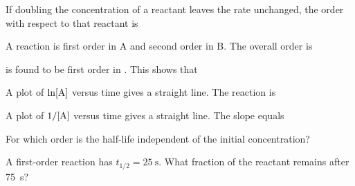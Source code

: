 \documentclass{apchem-exam}
\begin{document}
\begin{mcq}
  If doubling the concentration of a reactant leaves the rate unchanged, the
  order with respect to that reactant is
  \choices
\end{mcq}

\begin{mcq}
  A reaction is first order in A and second order in B. The overall order is
  \choices
\end{mcq}

\begin{mcq}
   is found to be first order in . This
  shows that
  \choices
\end{mcq}

\begin{mcq}
  A plot of $\ln[\ce{A}]$ versus time gives a straight line. The reaction is
  \choices
\end{mcq}

\begin{mcq}
  A plot of $1/[\ce{A}]$ versus time gives a straight line. The slope equals
  \choices
\end{mcq}

\begin{mcq}
  For which order is the half-life independent of the initial
  concentration?
  \choices
\end{mcq}

\begin{mcq}
  A first-order reaction has $t_{1/2} = \SI{25}{\second}$. What fraction of
  the reactant remains after \SI{75}{\second}?
  \choices
\end{mcq}
\end{document}
